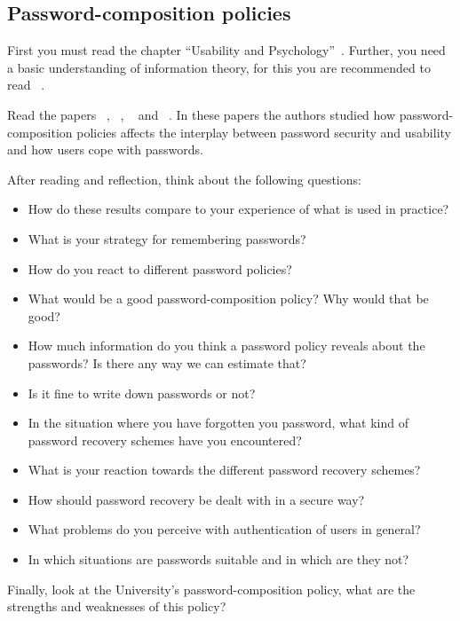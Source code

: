 \subsection{Password-composition policies}

First you must read the chapter \enquote{Usability and 
  Psychology}~\cite[Ch.~2]{Anderson2008sea}.
Further, you need a basic understanding of information theory, for this you are 
recommended to read ~\cite{Ueltschi2013se}.

Read the papers
~\cite{GuessAgainAndAgain},
~\cite{OfPasswordsAndPeople}, 
~\cite{CanLongPasswordsBeSecureAndUsable} 
and
~\cite{PasswordLifeCycle}.
In these papers the authors studied how password-composition policies affects 
the interplay between password security and usability and how users cope with 
passwords.

After reading and reflection, think about the following questions:
\begin{itemize}
  \item How do these results compare to your experience of what is used in 
    practice?
  \item What is your strategy for remembering passwords?
  \item How do you react to different password policies?
  \item What would be a good password-composition policy?
    Why would that be good?
  \item How much information do you think a password policy reveals about the 
    passwords?
    Is there any way we can estimate that?
  \item Is it fine to write down passwords or not?
  \item In the situation where you have forgotten you password,
  	what kind of password recovery schemes have you encountered?
  \item What is your reaction towards the different password recovery schemes?  
  \item How should password recovery be dealt with in a secure way?
  \item What problems do you perceive with authentication of users in general?
  \item In which situations are passwords suitable and in which are they not?
\end{itemize}
Finally, look at the University's password-composition policy, what are the 
strengths and weaknesses of this policy?

